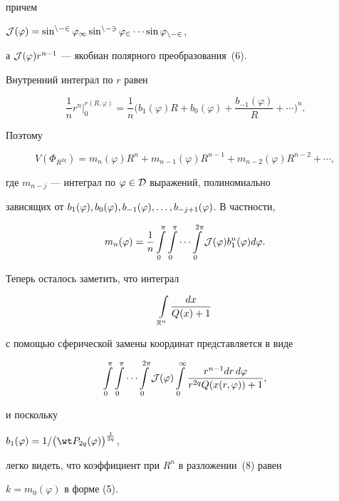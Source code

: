 \begin{pf}
причем


$\cal J(\varphi)=\sin^{n-2}\varphi_1\sin^{n-3}\varphi_2\dotsb\sin\varphi_{n-2}$,


а ${\cal J}(\varphi)r^{n-1}$ --- якобиан полярного преобразования~(6).


Внутренний интеграл по $r$ равен


$$


\frac{1}{n}r^n\Big|_0^{r(R,\varphi)}=\frac{1}{n}\bigg(b_1(\varphi)R


+b_0(\varphi)+\frac{b_{-1}(\varphi)}{R}+\dotsb\bigg)^n.


$$


Поэтому


\begin{equation}


V(\Phi_{R^{2q}})=m_n(\varphi) R^n+m_{n-1}(\varphi) R^{n-1}


+m_{n-2}(\varphi)R^{n-2}+\dotsb ,


\end{equation}


где $m_{n-j}$ --- интеграл по $\varphi\in\cal D$ выражений, полиномиально


зависящих от $b_1(\varphi),b_0(\varphi),b_{-1}(\varphi),\dotsc,\linebreak


b_{-j+1}(\varphi)$. В частности,


$$


m_n(\varphi)=\frac{1}{n}\int\limits_0^{\pi}\int\limits_0^{\pi}


\dotsb\int\limits_0^{2\pi}{{\J}(\varphi)b_1^n(\varphi)d\varphi}.


$$


Теперь осталось заметить, что интеграл


$$


\int\limits_{{\Bbb R}^n}\frac{dx}{Q(x)+1}


$$


с помощью сферической замены координат представляется в виде


$$


\int\limits_0^{\pi}\int\limits_0^{\pi}


\dotsb\int\limits_0^{2\pi}{\J}(\varphi)\int\limits_0^{\infty}


\frac{r^{n-1}dr\,d\varphi}{r^{2q}Q(x(r,\varphi))+1},


$$


и поскольку


$b_1(\varphi)=1/\big({\wt P_{2q}(\varphi)}\big)^{\frac{1}{2q}}$,


легко видеть, что коэффициент при $R^n$ в разложении~(8) равен


$k=m_0(\varphi)$ в форме (5).


\end{pf}





